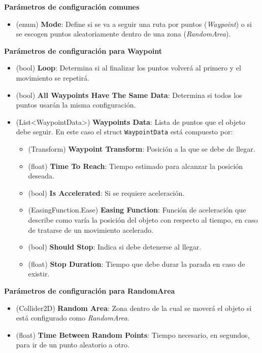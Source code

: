 \textbf{Parámetros de configuración comunes}
\begin{itemize} 
	\item (enum) \textbf{Mode}: Define si se va a seguir una ruta por puntos (\textit{Waypoint}) o si se escogen puntos aleatoriamente dentro de una zona (\textit{RandomArea}).
\end{itemize}

\textbf{Parámetros de configuración para Waypoint}
\begin{itemize} 	
	\item (bool) \textbf{Loop}: Determina si al finalizar los puntos volverá al primero y el movimiento se repetirá.
	\item (bool) \textbf{All Waypoints Have The Same Data}: Determina si todos los puntos usarán la misma configuración.
	\item (List<WaypointData>) \textbf{Waypoints Data}: Lista de puntos que el objeto debe seguir. En este caso el struct \texttt{WaypointData} está compuesto por:
	\begin{itemize} 	
		\item (Transform) \textbf{Waypoint Transform}: Posición a la que se debe de llegar.
		\item (float) \textbf{Time To Reach}: Tiempo estimado para alcanzar la posición deseada.
		\item (bool) \textbf{Is Accelerated}: Si se requiere aceleración.
		\item (EasingFunction.Ease) \textbf{Easing Function}: Función de aceleración que describe como varía la posición del objeto con respecto al tiempo, en caso de tratarse de un movimiento acelerado.
		\item (bool) \textbf{Should Stop}: Indica si debe detenerse al llegar.
		\item (float) \textbf{Stop Duration}: Tiempo que debe durar la parada en caso de existir.
	\end{itemize}
\end{itemize}

\textbf{Parámetros de configuración para RandomArea}
\begin{itemize} 	
	\item (Collider2D) \textbf{Random Area}: Zona dentro de la cual se moverá el objeto si está configurado como \textit{RandomArea}. 
	\item (float) \textbf{Time Between Random Points}: Tiempo necesario, en segundos, para ir de un punto aleatorio a otro.
\end{itemize}


